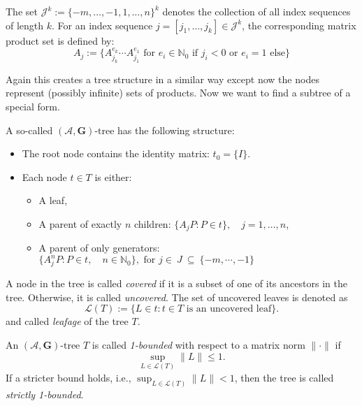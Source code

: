 \begin{definition}
    
    The set \( \mathcal{J}^k := \{-m, \dots, -1, 1, \dots, n\}^k \) denotes the collection of all index sequences of length \( k \). 
    For an index sequence \( j = [j_1, \dots, j_k] \in \mathcal{J}^k \), the corresponding matrix product set is defined by:
    $$
    A_j := \{ A_{j_k}^{e_k} \cdots A_{j_1}^{e_1} \text{ for } e_i \in \mathbb{N}_0 \text{ if } j_i < 0 \text{ or } e_i = 1 \text{ else}\} 
    $$
  
\end{definition}

Again this creates a tree structure in a similar way except now the nodes represent (possibly infinite) sets of products. 
Now we want to find a subtree of a special form. 

\begin{definition}
    A so-called $(\mathcal{A},\mathbf{G})\text{-tree}$ has the following structure: 
\begin{itemize}
    \item The root node contains the identity matrix: \( t_0 = \{I\} \).
    \item Each node \( t \in T \) is either:
    \begin{itemize}
        \item A leaf,
        \item A parent of exactly \( n \) children: \( \{A_j P : P \in t\},\quad j = 1, \dots, n \),
        \item A parent of only generators: \( \{A_j^n P : P \in t, \quad n \in \mathbb{N}_0\}, \text{ for } j\in~J~\subseteq ~\{ -m, \cdots, -1\}\)
    \end{itemize}
\end{itemize}
\end{definition}

\begin{definition}
    A node in the tree is called \emph{covered} if it is a subset of one of its ancestors in the tree. Otherwise, it is called \emph{uncovered}. 
    The set of uncovered leaves is denoted as
\[
    \mathcal{L}(T) := \{ L \in t : t \in T \text{ is an uncovered leaf} \}.
\]
and called \emph{leafage} of the tree $T$.
\end{definition}

\begin{definition}
An $(\mathcal{A},\mathbf{G})\text{-tree}$ $T$ is called \emph{1-bounded} with respect to a matrix norm \( \| \cdot \| \) if
\[
    \sup_{L \in \mathcal{L}(T)} \| L \| \leq 1.
\]
If a stricter bound holds, i.e., \( \sup_{L \in \mathcal{L}(T)} \| L \| < 1 \), then the tree is called \emph{strictly 1-bounded}.
\end{definition}


